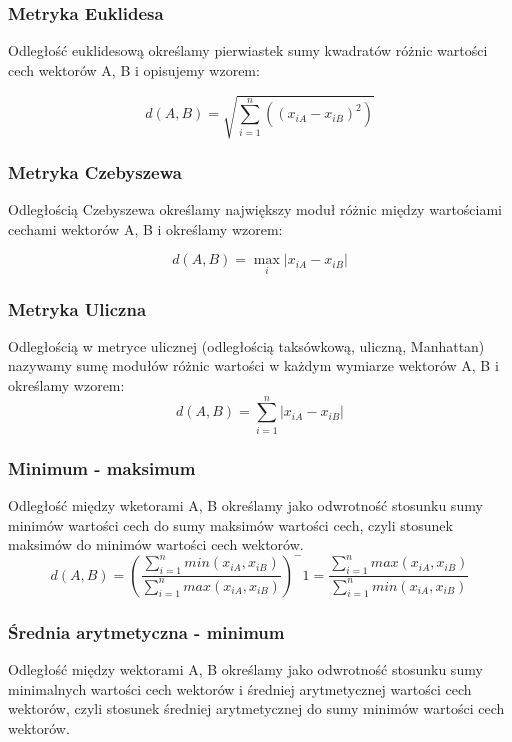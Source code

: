 \documentclass{classrep}
\begin{document}
\subsubsection{Metryka Euklidesa}
Odległość euklidesową określamy pierwiastek sumy kwadratów różnic wartości cech wektorów A, B i opisujemy wzorem:

\begin{equation}
d(A, B) =  \sqrt{\sum_{i=1}^n((x_{iA} - x_{iB})^2)}
\end{equation}

\subsubsection{Metryka Czebyszewa}
Odległością Czebyszewa określamy największy moduł różnic między wartościami cechami wektorów A, B i określamy wzorem:

\begin{equation}
d(A, B) =  \mathop{max}_{i}|x_{iA} - x_{iB}|
\end{equation}

\subsubsection{Metryka Uliczna}
Odległością w metryce ulicznej (odległością taksówkową, uliczną, Manhattan) nazywamy sumę modułów różnic wartości w każdym wymiarze wektorów A, B i określamy wzorem:
\begin{equation}
d(A, B) =  \sum_{i=1}^n|x_{iA} - x_{iB}|
\end{equation}
\subsubsection{Minimum - maksimum}
Odległość między wketorami A, B określamy jako odwrotność stosunku sumy minimów wartości cech do sumy maksimów wartości cech, czyli stosunek maksimów do minimów wartości cech wektorów.
\begin{equation}
d(A, B) = (\frac{\sum_{i=1}^n{min(x_{iA}, x_{iB})}}{\sum_{i=1}^n{max(x_{iA}, x_{iB})}})^-1 = \frac{\sum_{i=1}^n{max(x_{iA}, x_{iB})}}{\sum_{i=1}^n{min(x_{iA}, x_{iB})}}
\end{equation}

\subsubsection{Średnia arytmetyczna - minimum}
Odległość między wektorami A, B określamy jako odwrotność stosunku sumy minimalnych wartości cech wektorów i średniej arytmetycznej wartości cech wektorów, czyli stosunek średniej arytmetycznej do sumy minimów wartości cech wektorów.
\end{document}
